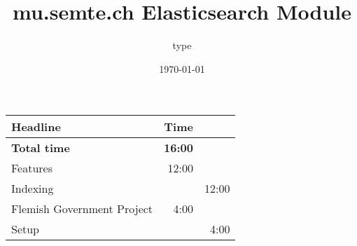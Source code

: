 \documentclass[11pt]{article}
\author{type}
\date{\today}
\title{mu.semte.ch Elasticsearch Module}
\begin{document}
\maketitle
\begin{center}
\begin{tabular}{lrr}
Headline & Time & \\
\hline
\textbf{Total time} & \textbf{16:00} & \\
\hline
Features & 12:00 & \\
\hspace*{1em} Indexing &  & 12:00\\
Flemish Government Project & 4:00 & \\
\hspace*{1em} Setup &  & 4:00\\
\end{tabular}
\end{center}
\end{document}
